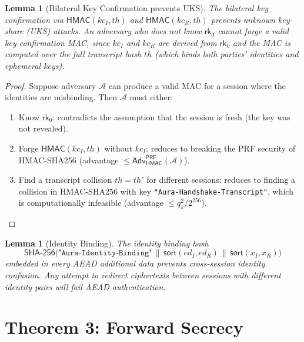 \documentclass[11pt,a4paper]{article}
\newtheorem{lemma}[theorem]{Lemma}
\theoremstyle{definition}
\theoremstyle{remark}
\newcommand{\adv}{\mathsf{Adv}}
\newcommand{\advA}{\mathcal{A}}
\newcommand{\HMAC}{\mathsf{HMAC}}
\newcommand{\SHA}{\mathsf{SHA\text{-}256}}
\newcommand{\PRF}{\mathsf{PRF}}
\newcommand{\rk}{\mathsf{rk}}
\newcommand{\concat}{\,\|\,}
\begin{document}
\begin{lemma}[Bilateral Key Confirmation prevents UKS]
\label{lem:kc}
The bilateral key confirmation via $\HMAC(\mathit{kc}_I, \mathit{th})$ and
$\HMAC(\mathit{kc}_R, \mathit{th})$ prevents unknown key-share (UKS) attacks.
An adversary who does not know $\rk_0$ cannot forge a valid key confirmation
MAC, since $\mathit{kc}_I$ and $\mathit{kc}_R$ are derived from $\rk_0$ and
the MAC is computed over the full transcript hash $\mathit{th}$ (which binds
both parties' identities and ephemeral keys).
\end{lemma}

\begin{proof}
Suppose adversary $\advA$ can produce a valid MAC for a session where the
identities are misbinding.  Then $\advA$ must either:
\begin{enumerate}[nosep]
  \item Know $\rk_0$: contradicts the assumption that the session is fresh
        (the key was not revealed).
  \item Forge $\HMAC(\mathit{kc}_I, \mathit{th})$ without $\mathit{kc}_I$:
        reduces to breaking the PRF security of HMAC-SHA256 (advantage
        $\leq \adv^{\PRF}_{\HMAC}(\advA)$).
  \item Find a transcript collision $\mathit{th} = \mathit{th}'$ for different
        sessions: reduces to finding a collision in HMAC-SHA256 with key
        \texttt{"Aura-Handshake-Transcript"}, which is computationally
        infeasible (advantage $\leq q_s^2 / 2^{256}$). \qedhere
\end{enumerate}
\end{proof}

\begin{lemma}[Identity Binding]
\label{lem:identity}
The identity binding hash
\[
  \SHA\bigl(\texttt{"Aura-Identity-Binding"} \concat
  \mathsf{sort}(\mathit{ed}_I, \mathit{ed}_R) \concat
  \mathsf{sort}(\mathit{x}_I, \mathit{x}_R)\bigr)
\]
embedded in every AEAD additional data prevents cross-session identity confusion.  Any attempt to
redirect ciphertexts between sessions with different identity pairs will fail
AEAD authentication.
\end{lemma}


\section{Theorem 3: Forward Secrecy}
\label{sec:thm3}
\end{document}
